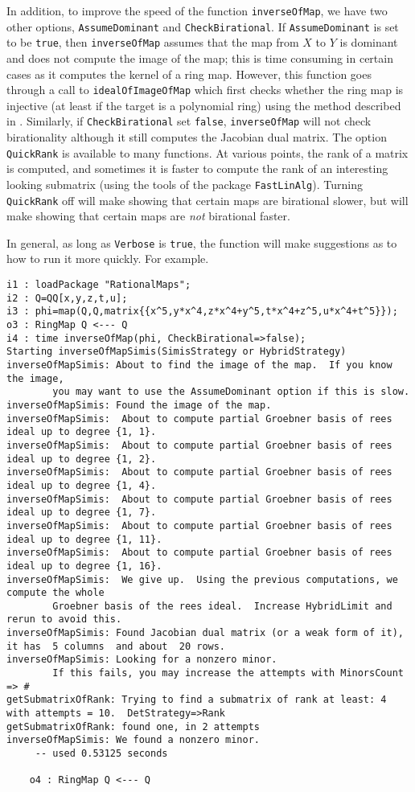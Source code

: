 \documentclass[11pt]{amsart}
\numberwithin{equation}{theorem}
\renewcommand{\:}{\colon}
\theoremstyle{theorem}
\begin{document}
 In addition, to improve the speed of the function {\tt inverseOfMap}, we have two other options, {\tt AssumeDominant} and {\tt CheckBirational}. If {\tt AssumeDominant} is set  to be {\tt true},  then  {\tt inverseOfMap} assumes that the map from $X$ to $Y$ is dominant and does not compute the image of the map; this is time consuming in certain cases as it computes the kernel of a ring map.  However, this function goes through a call to {\tt idealOfImageOfMap} which first checks whether the ring map is injective (at least if the target is a polynomial ring) using the method described in \cite[Proposition 1.1]{SimisTwoDifferentialThemes}.
 Similarly, if {\tt CheckBirational} set {\tt false}, {\tt inverseOfMap} will  not check birationality although it still computes the Jacobian dual matrix.  The option {\tt QuickRank} is available to many functions.  At various points, the rank of a matrix is computed, and sometimes it is faster to compute the rank of an interesting looking submatrix (using the tools of the package {\tt FastLinAlg}).  Turning {\tt QuickRank} off will make showing that certain maps are birational slower, but will make showing that certain maps are \emph{not} birational faster.

 In general, as long as {\tt Verbose} is {\tt true}, the function will make suggestions as to how to run it more quickly.  For example.
{
{\scriptsize\color{blue}
\begin{verbatim}
i1 : loadPackage "RationalMaps";
i2 : Q=QQ[x,y,z,t,u];
i3 : phi=map(Q,Q,matrix{{x^5,y*x^4,z*x^4+y^5,t*x^4+z^5,u*x^4+t^5}});
o3 : RingMap Q <--- Q
i4 : time inverseOfMap(phi, CheckBirational=>false);
Starting inverseOfMapSimis(SimisStrategy or HybridStrategy)
inverseOfMapSimis: About to find the image of the map.  If you know the image,
        you may want to use the AssumeDominant option if this is slow.
inverseOfMapSimis: Found the image of the map.
inverseOfMapSimis:  About to compute partial Groebner basis of rees ideal up to degree {1, 1}.
inverseOfMapSimis:  About to compute partial Groebner basis of rees ideal up to degree {1, 2}.
inverseOfMapSimis:  About to compute partial Groebner basis of rees ideal up to degree {1, 4}.
inverseOfMapSimis:  About to compute partial Groebner basis of rees ideal up to degree {1, 7}.
inverseOfMapSimis:  About to compute partial Groebner basis of rees ideal up to degree {1, 11}.
inverseOfMapSimis:  About to compute partial Groebner basis of rees ideal up to degree {1, 16}.
inverseOfMapSimis:  We give up.  Using the previous computations, we compute the whole
        Groebner basis of the rees ideal.  Increase HybridLimit and rerun to avoid this.
inverseOfMapSimis: Found Jacobian dual matrix (or a weak form of it), it has  5 columns  and about  20 rows.
inverseOfMapSimis: Looking for a nonzero minor.
        If this fails, you may increase the attempts with MinorsCount => #
getSubmatrixOfRank: Trying to find a submatrix of rank at least: 4 with attempts = 10.  DetStrategy=>Rank
getSubmatrixOfRank: found one, in 2 attempts
inverseOfMapSimis: We found a nonzero minor.
     -- used 0.53125 seconds

    o4 : RingMap Q <--- Q\end{verbatim}
}}
\end{document}
